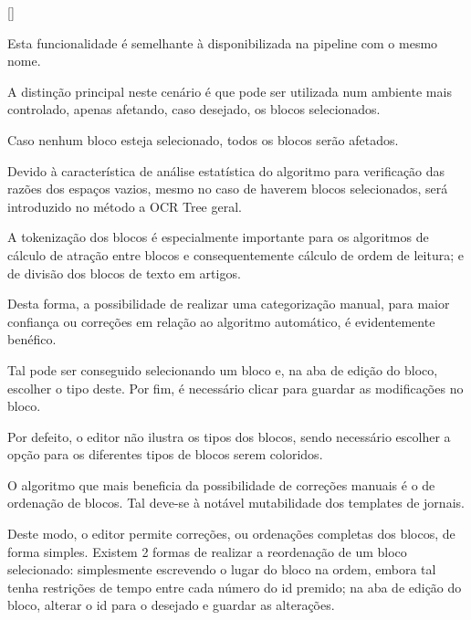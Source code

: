 

[\normalsize]

Esta funcionalidade é semelhante à disponibilizada na pipeline com o mesmo nome.

A distinção principal neste cenário é que pode ser utilizada num ambiente mais controlado, apenas afetando, caso desejado, os blocos selecionados.

Caso nenhum bloco esteja selecionado, todos os blocos serão afetados.

Devido à característica de análise estatística do algoritmo para verificação das razões dos espaços vazios, mesmo no caso de haverem blocos selecionados, será introduzido no método a OCR Tree geral.





A tokenização dos blocos é especialmente importante para os algoritmos de cálculo de atração entre blocos e consequentemente cálculo de ordem de leitura; e de divisão dos blocos de texto em artigos.

Desta forma, a possibilidade de realizar uma categorização manual, para maior confiança ou correções em relação ao algoritmo automático, é evidentemente benéfico.

Tal pode ser conseguido selecionando um bloco e, na aba de edição do bloco, escolher o tipo deste. Por fim, é necessário clicar para guardar as modificações no bloco.


Por defeito, o editor não ilustra os tipos dos blocos, sendo necessário escolher a opção para os diferentes tipos de blocos serem coloridos.



O algoritmo que mais beneficia da possibilidade de correções manuais é o de ordenação de blocos. Tal deve-se à notável mutabilidade dos templates de jornais.

Deste modo, o editor permite correções, ou ordenações completas dos blocos, de forma simples. Existem 2 formas de realizar a reordenação de um bloco selecionado: simplesmente escrevendo o lugar do bloco na ordem, embora tal tenha restrições de tempo entre cada número do id premido; na aba de edição do bloco, alterar o id para o desejado e guardar as alterações.

